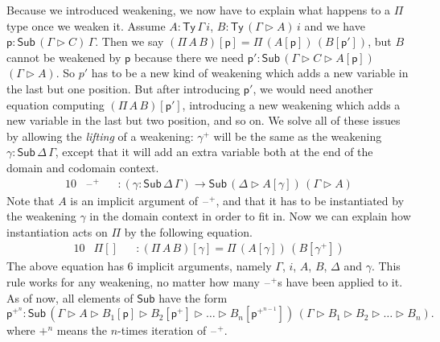 \documentclass[a4paper,UKenglish,cleveref, autoref, thm-restate]{lipics-v2021}
\newcommand{\ra}{\rightarrow}
\newcommand{\Ty}{\mathsf{Ty}}
\newcommand{\Sub}{\mathsf{Sub}}
\newcommand{\p}{\mathsf{p}}
\newcommand{\ext}{\mathop{\triangleright}}
\newcommand{\blank}{\mathord{\hspace{1pt}\text{--}\hspace{1pt}}} %
\begin{document}
Because we introduced weakening, we now have to explain what happens
to a $\Pi$ type once we weaken it. Assume $A : \Ty\,\Gamma\,i$,
$B:\Ty\,(\Gamma\ext A)\,i$ and we have $\p:\Sub\,(\Gamma\ext
C)\,\Gamma$. Then we say $(\Pi\,A\,B)[\p] = \Pi\,(A[\p])\,(B[\p'])$,
but $B$ cannot be weakened by $\p$ because there we need $\p' :
\Sub\,(\Gamma\ext C\ext A[\p])$ $(\Gamma\ext A)$. So $p'$ has to be a %
new kind of weakening which adds a new variable in the last but one
position. But after introducing $\p'$, we would need another equation computing $(\Pi\,A\,B)[\p']$,
introducing a new weakening which adds a new variable in the last but
two position, and so on. We solve all of these issues by allowing the
\emph{lifting} of a weakening: $\gamma^+$ will be the same as the
weakening $\gamma : \Sub\,\Delta\,\Gamma$, except that it will add an
extra variable both at the end of the domain and codomain
context.
\begin{alignat*}{10}
& \blank^+ && : (\gamma:\Sub\,\Delta\,\Gamma)\ra\Sub\,(\Delta\ext A[\gamma])\,(\Gamma\ext A)
\end{alignat*}
Note that $A$ is an implicit argument of $\blank^+$, and that it has
to be instantiated by the weakening $\gamma$ in the domain context in
order to fit in. Now we can explain how instantiation acts on $\Pi$ by
the following equation.
\begin{alignat*}{10}
& \Pi[] && : (\Pi\,A\,B)[\gamma] = \Pi\,(A[\gamma])\,(B[\gamma^+])
\end{alignat*}
The above equation has 6 implicit arguments, namely $\Gamma$, $i$,
$A$, $B$, $\Delta$ and $\gamma$.  This rule works for any weakening,
no matter how many $\blank^+$s have been applied to it. As of now, all
elements of $\Sub$ have the form
\[
\p^{+^n} : \Sub\,(\Gamma\ext A\ext B_1[\p]\ext B_2[\p^+]\ext\dots\ext B_n[\p^{+^{n-1}}])\,(\Gamma\ext B_1\ext B_2\ext\dots\ext B_n).
\]
where $+^n$ means the $n$-times iteration of $\blank^+$.
\end{document}
